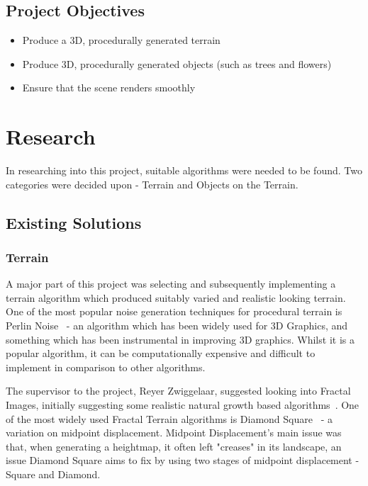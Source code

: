 \documentclass[a4paper,10pt]{report}
\begin{document}
\section{Project Objectives}

\begin{itemize}
    \item Produce a 3D, procedurally generated terrain
    \item Produce 3D, procedurally generated objects (such as trees and flowers)
    \item Ensure that the scene renders smoothly
\end{itemize}

\chapter{Research}

In researching into this project, suitable algorithms were needed to be found. Two categories were decided upon - Terrain and Objects on the Terrain. \medskip

\section{Existing Solutions}

\subsection{Terrain}

A major part of this project was selecting and subsequently implementing a terrain algorithm which produced suitably varied and realistic looking terrain. One of the most popular noise generation techniques for procedural terrain is Perlin Noise~\cite{perlin2002improving} - an algorithm which has been widely used for 3D Graphics, and something which has been instrumental in improving 3D graphics. Whilst it is a popular algorithm, it can be computationally expensive and difficult to implement in comparison to other algorithms.\medskip

The supervisor to the project, Reyer Zwiggelaar, suggested looking into Fractal Images, initially suggesting some realistic natural growth based algorithms~\cite{Bilsborough3424}. One of the most widely used Fractal Terrain algorithms is Diamond Square~\cite{olsen2004realtime} - a variation on midpoint displacement. Midpoint Displacement's main issue was that, when generating a heightmap, it often left "creases" in its landscape, an issue Diamond Square aims to fix by using two stages of midpoint displacement - Square and Diamond.  \medskip
\end{document}
